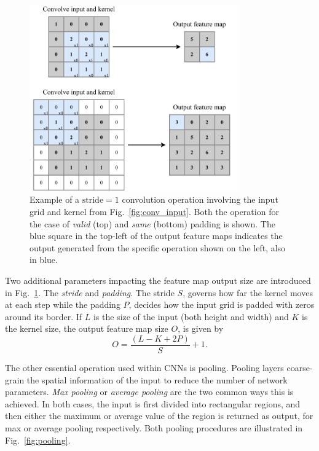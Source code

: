 \begin{figure} %
    \includegraphics[width=0.8\textwidth]{diagrams/6-cnn/conv_operation.pdf}
    \caption[Example of a convolutional operation]
    {Example of a $\text{stride}=1$ convolution operation involving the input grid and kernel from
        Fig.~\ref{fig:conv_input}. Both the operation for the case of \emph{valid} (top) and
        \emph{same} (bottom) padding is shown. The blue square in the top-left of the output
        feature maps indicates the output generated from the specific operation shown on the left,
        also in blue.}
    \label{fig:conv_operation}
\end{figure}

Two additional parameters impacting the feature map output size are introduced in
Fig.~\ref{fig:conv_operation}. The \emph{stride} and \emph{padding}. The stride $S$, governs how
far the kernel moves at each step while the padding $P$, decides how the input grid is padded with
zeros around its border. If $L$ is the size of the input (both height and width) and $K$ is the
kernel size, the output feature map size $O$, is given by
\begin{equation}
    O=\frac{(L-K+2P)}{S}+1.
    \label{eq:conv_size}
\end{equation}

The other essential operation used within CNNs is pooling. Pooling layers coarse-grain the spatial
information of the input to reduce the number of network parameters. \emph{Max pooling} or
\emph{average pooling} are the two common ways this is achieved. In both cases, the input is first
divided into rectangular regions, and then either the maximum or average value of the region is
returned as output, for max or average pooling respectively. Both pooling procedures are
illustrated in Fig.~\ref{fig:pooling}.

